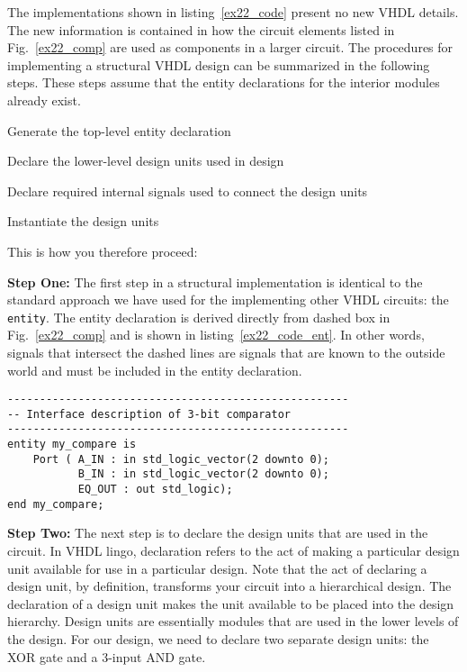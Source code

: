 The implementations shown in listing~\ref{ex22_code} present no new VHDL details. The new information is contained in how the circuit elements listed in Fig.~\ref{ex22_comp} are used as components in a larger circuit. The procedures for implementing a structural VHDL design can be summarized in the following steps. These steps assume that the entity declarations for the interior modules already exist.
\begin{my_list}
\item Generate the top-level entity declaration
\item Declare the lower-level design units used in design
\item Declare required internal signals used to connect the design units
\item Instantiate the design units
\end{my_list}
This is how you therefore proceed:

\noindent
\textbf{Step One:} The first step in a structural implementation is identical to the standard approach we have used for the implementing other VHDL circuits: the \texttt{entity}. The entity declaration is derived directly from dashed box in Fig.~\ref{ex22_comp} and is shown in listing~\ref{ex22_code_ent}. In other words, signals that intersect the dashed lines are signals that are known to the outside world and must be included in the entity declaration.

\begin{lstlisting}[label=ex22_code_ent, caption=Entity declaration for 3-bit comparator.]
-----------------------------------------------------
-- Interface description of 3-bit comparator
-----------------------------------------------------
entity my_compare is
    Port ( A_IN : in std_logic_vector(2 downto 0);
           B_IN : in std_logic_vector(2 downto 0);
           EQ_OUT : out std_logic);
end my_compare;
\end{lstlisting}

\noindent
\textbf{Step Two:} The next step is to declare the design units that are used in the circuit. In VHDL lingo, declaration refers to the act of making a particular design unit available for use in a particular design. Note that the act of declaring a design unit, by definition, transforms your circuit into a hierarchical design. The declaration of a design unit makes the unit available to be placed into the design hierarchy. Design units are essentially modules that are used in the lower levels of the design. For our design, we need to declare two separate design units: the XOR gate and a 3-input AND gate.  

